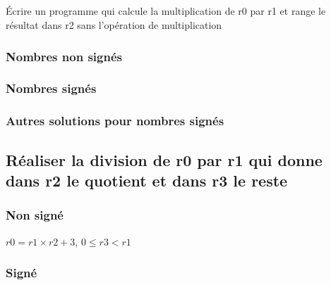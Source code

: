 \documentclass[12pt,a4paper,openany]{book}
\begin{document}
\subsection{}
\'Ecrire un programme qui calcule la multiplication de r0 par r1 et range le résultat dans r2 sans l'opération de multiplication
\subsubsection{Nombres non signés}

\subsubsection{Nombres signés}


\subsubsection{Autres solutions pour nombres signés}


\subsection{Réaliser la division de r0
par r1 qui donne dans r2 le quotient et dans r3
le reste}
\subsubsection{Non signé}
$r0 = r1 \times r2 + 3$, $0 \leq r3 < r1$


\subsubsection{Signé}


\end{document}
